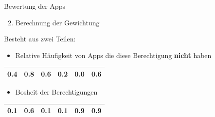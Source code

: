 \documentclass[compress,t]{beamer}
\begin{document}
\begin{frame}{Bewertung der Apps}

    \begin{enumerate}
        \setcounter{enumi}{1}
        \item Berechnung der Gewichtung
    \end{enumerate}

    Besteht aus zwei Teilen:
    \begin{itemize}
        \item Relative Häufigkeit von Apps die diese Berechtigung \textbf{nicht} haben
    \end{itemize}

    \begin{center}
    \begin{tabular}{|*{6}{c|}}
        \hline
        0.4 & 0.8 & 0.6 & 0.2 & 0.0 & 0.6 \\
        \hline
    \end{tabular}
    \end{center}

    \begin{itemize}
        \item Bosheit der Berechtigungen
    \end{itemize}

    \begin{center}
    \begin{tabular}{|*{6}{c|}}
        \hline
        0.1 & 0.6 & 0.1 & 0.1 & 0.9 & 0.9 \\
        \hline
    \end{tabular}
    \end{center}

\end{frame}
\end{document}
